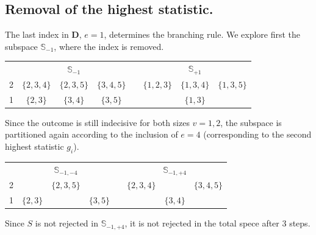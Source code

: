 \documentclass[11pt,a4paper,openright,twoside]{article}
\begin{document}
\subsection{Removal of the highest statistic.}
The last index in $\mathbf{D}$, $e=1$, determines the branching rule. We explore first the subspace $\mathbb{S}_{-1}$, where the index is removed.
\begin{table}[h!]
\centering
\begin{tabular}{c|ccccccc}
 & \multicolumn{3}{c}{$\mathbb{S}_{-1}$} & & \multicolumn{3}{c}{$\mathbb{S}_{+1}$}\\
\cline{2-4} \cline{6-8}
2 & $\{2,3,4\}$ & $\{2,3,5\}$ & $\{3,4,5\}$ & & $\{1,2,3\}$ & $\{1,3,4\}$ & $\{1,3,5\}$ \\
1 & $\{2,3\}$ & $\{3,4\}$ & $\{3,5\}$ & & & $\{1,3\}$ &  \\
\end{tabular}
\end{table}

Since the outcome is still indecisive for both sizes $v=1,2$, the subspace is partitioned again according to the inclusion of $e=4$ (corresponding to the second highest statistic $g_i$).
\begin{table}[h!]
\centering
\begin{tabular}{c|ccccccc}
 & \multicolumn{3}{c}{$\mathbb{S}_{-1,-4}$} & & \multicolumn{3}{c}{$\mathbb{S}_{-1,+4}$}\\
\cline{2-4} \cline{6-8}
2 &  & $\{2,3,5\}$ &  & & $\{2,3,4\}$ &  & $\{3,4,5\}$ \\
1 & $\{2,3\}$ &  & $\{3,5\}$ &  &  & $\{3,4\}$ &  \\
\end{tabular}
\end{table}

Since $S$ is not rejected in $\mathbb{S}_{-1,+4}$, it is not rejected in the total spece after 3 steps.

\vspace{10mm}
\end{document}
